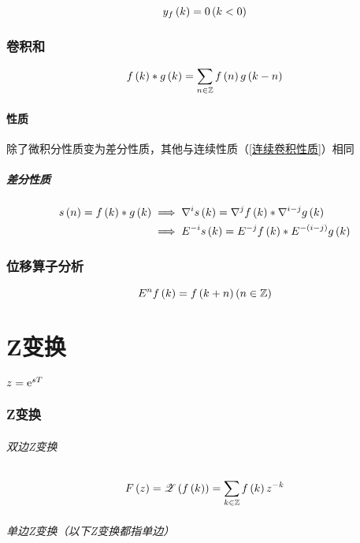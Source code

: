 \documentclass{article}
\begin{document}
\[y_f\left(k\right)=0\left(k<0\right)\]

\section{卷积和}

\[f\left(k\right)\ast g\left(k\right)=\sum_{n\in\mathbb Z} f\left(n\right)g\left(k-n\right)\]

\subsection{性质}

除了微积分性质变为差分性质，其他与连续性质（\ref{连续卷积性质}）相同

\subsubsection{差分性质}

\[\begin{aligned}
        s\left(n\right)=f\left(k\right)\ast g\left(k\right) & \implies\nabla^is\left(k\right)=\nabla^jf\left(k\right)\ast\nabla^{i-j}g\left(k\right) \\
                                 & \implies E^{-i}s\left(k\right)=E^{-j}f\left(k\right)\ast E^{-\left(i-j\right)}g\left(k\right)
    \end{aligned}\]

\section{位移算子分析}

\[E^nf\left(k\right)=f\left(k+n\right)\left(n\in\mathbb Z\right)\]

\part{Z变换}

$z=\mathrm e^{sT}$

\section{Z变换}

\paragraph{双边Z变换}

\[F\left(z\right)=\mathscr Z\left(f\left(k\right)\right)=\sum_{k\in\mathbb Z}f\left(k\right) z^{-k}\]

\paragraph{单边Z变换（以下Z变换都指单边）}
\end{document}
